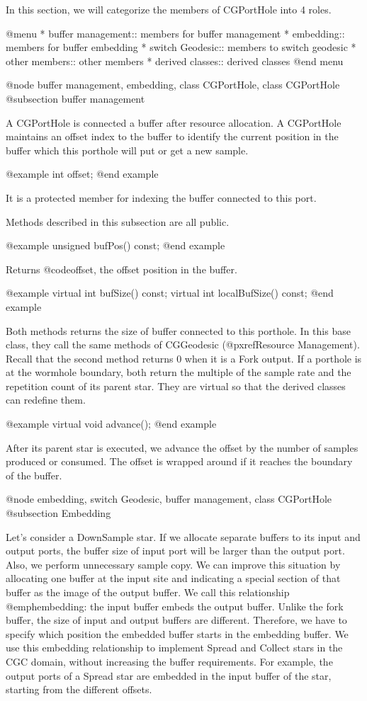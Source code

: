 In this section, we will categorize the members of CGPortHole into 4
roles.

@menu
* buffer management::			members for buffer management
* embedding::				members for buffer embedding
* switch Geodesic::			members to switch geodesic
* other members::			other members
* derived classes::			derived classes
@end menu

@node buffer management, embedding, class CGPortHole, class CGPortHole
@subsection buffer management

A CGPortHole is connected a buffer after resource allocation. A CGPortHole
maintains an offset index to the buffer to identify the current position
in the buffer which this porthole will put or get a new sample.

@example
int offset;
@end example

It is a protected member for indexing the buffer connected to this port.

Methods described in this subsection are all public.

@example
unsigned bufPos() const;
@end example

Returns @code{offset}, the offset position in the buffer.

@example
virtual int bufSize() const;
virtual int localBufSize() const;
@end example

Both methods returns the size of buffer connected to this porthole.
In this base class, they call the same methods of CGGeodesic
(@pxref{Resource Management}). Recall that the second method returns 0
when it is a Fork output. If a porthole is at the wormhole boundary,
both return the multiple of the sample rate and the repetition count of its
parent star. They are virtual so that the derived classes can redefine them.

@example
virtual void advance();
@end example

After its parent star is executed, we advance the offset by the number of
samples produced or consumed. The offset is wrapped around if it reaches
the boundary of the buffer.

@node embedding, switch Geodesic, buffer management, class CGPortHole
@subsection Embedding

Let's consider a DownSample star. If we allocate separate buffers to
its input and output ports, the buffer size of input port will be
larger than the output port. Also, we perform unnecessary sample copy.
We can improve this situation by allocating one buffer at the input site
and indicating a special section of that buffer as the image of the output
buffer. We call this relationship @emph{embedding}: the input buffer
embeds the output buffer. Unlike the fork buffer, the size of input and
output buffers are different. Therefore, we have to specify which position
the embedded buffer starts in the embedding buffer. We use this embedding
relationship to implement Spread and Collect stars in the CGC domain, without
increasing the buffer requirements. For example, the output ports of
a Spread star are embedded in the input buffer of the star, starting from
the different offsets.

